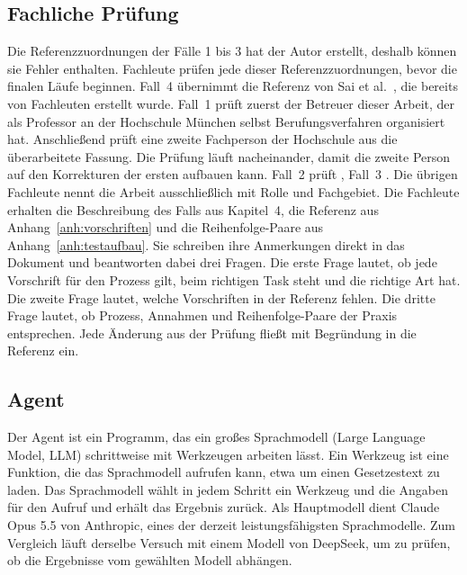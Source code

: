 \subsection{Fachliche Prüfung}\label{sec:fachliche_pruefung}
Die Referenzzuordnungen der Fälle 1 bis 3 hat der Autor erstellt, deshalb können sie Fehler enthalten.
Fachleute prüfen jede dieser Referenzzuordnungen, bevor die finalen Läufe beginnen.
Fall~4 übernimmt die Referenz von Sai et al.~\cite{sai2024}, die bereits von Fachleuten erstellt wurde.
Fall~1 prüft zuerst der Betreuer dieser Arbeit, der als Professor an der Hochschule München selbst Berufungsverfahren organisiert hat.
Anschließend prüft eine zweite Fachperson der Hochschule aus  die überarbeitete Fassung.
Die Prüfung läuft nacheinander, damit die zweite Person auf den Korrekturen der ersten aufbauen kann.
Fall~2 prüft , Fall~3 .
Die übrigen Fachleute nennt die Arbeit ausschließlich mit Rolle und Fachgebiet.
Die Fachleute erhalten die Beschreibung des Falls aus Kapitel~4, die Referenz aus Anhang~\ref{anh:vorschriften} und die Reihenfolge-Paare aus Anhang~\ref{anh:testaufbau}.
Sie schreiben ihre Anmerkungen direkt in das Dokument und beantworten dabei drei Fragen.
Die erste Frage lautet, ob jede Vorschrift für den Prozess gilt, beim richtigen Task steht und die richtige Art hat.
Die zweite Frage lautet, welche Vorschriften in der Referenz fehlen.
Die dritte Frage lautet, ob Prozess, Annahmen und Reihenfolge-Paare der Praxis entsprechen.
Jede Änderung aus der Prüfung fließt mit Begründung in die Referenz ein.

\subsection{Agent}\label{sec:agent}
Der Agent ist ein Programm, das ein großes Sprachmodell (Large Language Model, LLM) schrittweise mit Werkzeugen arbeiten lässt.
Ein Werkzeug ist eine Funktion, die das Sprachmodell aufrufen kann, etwa um einen Gesetzestext zu laden.
Das Sprachmodell wählt in jedem Schritt ein Werkzeug und die Angaben für den Aufruf und erhält das Ergebnis zurück.
Als Hauptmodell dient Claude Opus 5.5 von Anthropic, eines der derzeit leistungsfähigsten Sprachmodelle.
Zum Vergleich läuft derselbe Versuch mit einem Modell von DeepSeek, um zu prüfen, ob die Ergebnisse vom gewählten Modell abhängen.

